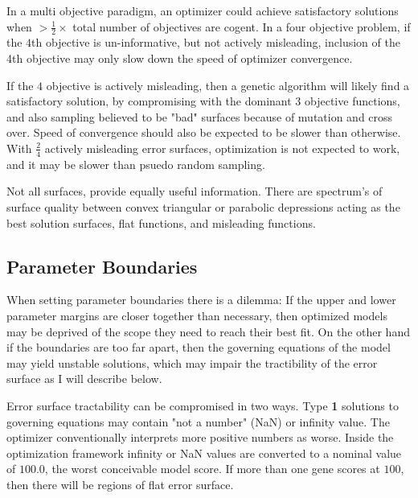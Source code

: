    In a multi objective paradigm, an optimizer could achieve satisfactory solutions when $> \frac{1}{2} \times$ total number of objectives are cogent. In a four objective problem, if the $4$th objective is un-informative, but not actively misleading, inclusion of the 4th objective may only slow down the speed of optimizer convergence.
   
   If the $4$ objective is actively misleading, then a genetic algorithm will likely find a satisfactory solution, by compromising with the dominant $3$ objective functions, and also sampling believed to be "bad" surfaces because of mutation and cross over. Speed of convergence should also be expected to be slower than otherwise. With $\frac{2}{4}$ actively misleading error surfaces, optimization is not expected to work, and it may be slower than psuedo random sampling.
   
   
   Not all surfaces, provide equally useful information. There are spectrum's of surface quality between convex triangular or parabolic depressions acting as the best solution surfaces, flat functions, and misleading functions. 
   
  
\subsection{Parameter Boundaries}
When setting parameter boundaries there is a dilemma: If the upper and lower parameter margins are closer together than necessary, then optimized models may be deprived of the scope they need to reach their best fit. On the other hand if the boundaries are too far apart, then the governing equations of the model may yield unstable solutions, which may impair the tractibility of the error surface as I will describe below.

Error surface tractability can be compromised in two ways.
Type \textbf{1} solutions to governing equations may contain "not a number" (NaN) or infinity value. The optimizer conventionally interprets more positive numbers as worse. Inside the optimization framework infinity or NaN values are converted to a nominal value of $100.0$, the worst conceivable model score. If more than one gene scores at $100$, then there will be regions of flat error surface. %

